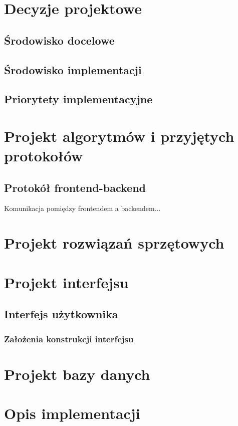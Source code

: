 \section{Decyzje projektowe}

\subsection{Środowisko docelowe}

\subsection{Środowisko implementacji}

\subsection{Priorytety implementacyjne}

\section{Projekt algorytmów i przyjętych protokołów}

\subsection{Protokół frontend-backend}
Komunikacja pomiędzy frontendem a backendem...

\section{Projekt rozwiązań sprzętowych}

\section{Projekt interfejsu}

\subsection{Interfejs użytkownika}

\subsubsection{Założenia konstrukcji interfejsu}

\section{Projekt bazy danych}

\section{Opis implementacji}
